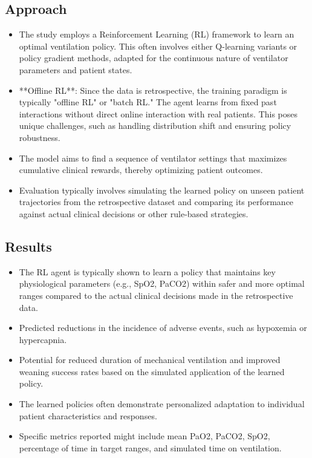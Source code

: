 \subsection*{Approach}
\begin{itemize}
    \item The study employs a Reinforcement Learning (RL) framework to learn an optimal ventilation policy. This often involves either Q-learning variants or policy gradient methods, adapted for the continuous nature of ventilator parameters and patient states.
    \item **Offline RL**: Since the data is retrospective, the training paradigm is typically "offline RL" or "batch RL." The agent learns from fixed past interactions without direct online interaction with real patients. This poses unique challenges, such as handling distribution shift and ensuring policy robustness.
    \item The model aims to find a sequence of ventilator settings that maximizes cumulative clinical rewards, thereby optimizing patient outcomes.
    \item Evaluation typically involves simulating the learned policy on unseen patient trajectories from the retrospective dataset and comparing its performance against actual clinical decisions or other rule-based strategies.
\end{itemize}

\subsection*{Results}
\begin{itemize}
    \item The RL agent is typically shown to learn a policy that maintains key physiological parameters (e.g., SpO2, PaCO2) within safer and more optimal ranges compared to the actual clinical decisions made in the retrospective data.
    \item Predicted reductions in the incidence of adverse events, such as hypoxemia or hypercapnia.
    \item Potential for reduced duration of mechanical ventilation and improved weaning success rates based on the simulated application of the learned policy.
    \item The learned policies often demonstrate personalized adaptation to individual patient characteristics and responses.
    \item Specific metrics reported might include mean PaO2, PaCO2, SpO2, percentage of time in target ranges, and simulated time on ventilation.
\end{itemize}

